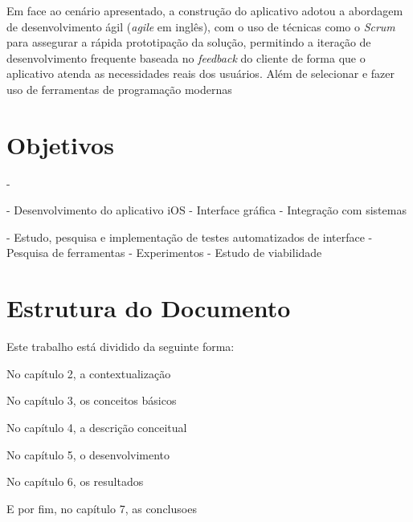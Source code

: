 Em face ao cenário apresentado, a construção do aplicativo adotou a abordagem de desenvolvimento ágil (\textit{agile} em inglês), com o uso de técnicas como o \textit{Scrum} para assegurar a rápida prototipação da solução, permitindo a iteração de desenvolvimento frequente baseada no \textit{feedback} do cliente de forma que o aplicativo atenda as necessidades reais dos usuários. Além de selecionar e fazer uso de ferramentas de programação modernas 

\section{Objetivos}-

- Desenvolvimento do aplicativo iOS
    - Interface gráfica
    - Integração com sistemas
    
- Estudo, pesquisa e implementação de testes automatizados de interface 
    - Pesquisa de ferramentas
    - Experimentos
    - Estudo de viabilidade

\section{Estrutura do Documento}

Este trabalho está dividido da seguinte forma: 

No capítulo 2, a contextualização

No capítulo 3, os conceitos básicos

No capítulo 4, a descrição conceitual

No capítulo 5, o desenvolvimento

No capítulo 6, os resultados

E por fim, no capítulo 7, as conclusoes 
